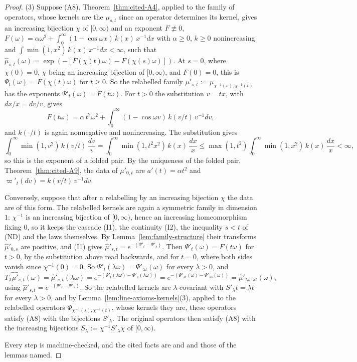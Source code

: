 \begin{proof}
(3) Suppose (A8). Theorem~\ref{thm:cited-A4}, applied to the family of operators, whose kernels
are the $\mu_{s,t}$ since an operator determines its kernel, gives an increasing bijection $\chi$
of $[0,\infty)$ and an exponent $F \not\equiv 0$,
$F(\omega) = \alpha\omega^2 + \int_0^\infty(1 - \cos\omega x)\,k(x)\,x^{-1}dx$ with $\alpha \ge 0$,
$k \ge 0$ nonincreasing and $\int\min(1,x^2)\,k(x)\,x^{-1}dx < \infty$, such that
$\widehat\mu_{s,t}(\omega) = \exp(-[F(\chi(t)\omega) - F(\chi(s)\omega)])$. At $s = 0$, where
$\chi(0) = 0$, $\chi$ being an increasing bijection of $[0,\infty)$, and $F(0) = 0$, this is
$\Psi_t(\omega) = F(\chi(t)\omega)$ for $t \ge 0$. So the relabelled family
$\mu'_{s,t} := \mu_{\chi^{-1}(s),\chi^{-1}(t)}$ has the exponents $\Psi'_t(\omega) = F(t\omega)$.
For $t > 0$ the substitution $v = tx$, with $dx/x = dv/v$, gives
\[
  F(t\omega) = \alpha\,t^2\omega^2 + \int_0^\infty(1 - \cos\omega v)\,k(v/t)\,v^{-1}dv ,
\]
and $k(\cdot/t)$ is again nonnegative and nonincreasing. The substitution gives
\[
  \int_0^\infty\min(1, v^2)\,k(v/t)\,\frac{dv}{v} = \int_0^\infty\min(1, t^2x^2)\,k(x)\,\frac{dx}{x}
  \le \max(1, t^2)\int_0^\infty\min(1, x^2)\,k(x)\,\frac{dx}{x} < \infty ,
\]
so this is the exponent of a folded pair. By the
uniqueness of the folded pair, Theorem~\ref{thm:cited-A9}, the data of $\mu'_{0,t}$ are $a'(t) = \alpha t^2$ and
$\varpi'_t(dv) = k(v/t)\,v^{-1}dv$.

Conversely, suppose that after a relabelling by an increasing bijection $\chi$ the data are of
this form. The relabelled kernels are again a symmetric family in dimension $1$: $\chi^{-1}$ is an
increasing bijection of $[0,\infty)$, hence an increasing homeomorphism fixing $0$, so it keeps the
cascade (I1), the continuity (I2), the inequality $s < t$ of (ND) and the laws themselves. By
Lemma~\ref{lem:family-structure} their transforms $\widehat\mu'_{0,s}$ are positive, and (I1) gives
$\widehat\mu'_{s,t} = e^{-(\Psi'_t - \Psi'_s)}$. Then $\Psi'_t(\omega) = F(t\omega)$ for $t > 0$,
by the substitution above read
backwards, and for $t = 0$, where both sides vanish since $\chi^{-1}(0) = 0$. So
$\Psi'_t(\lambda\omega) = \Psi'_{\lambda t}(\omega)$ for every $\lambda > 0$, and
\[
  \widehat{T_\lambda\mu'_{s,t}}(\omega) = \widehat\mu'_{s,t}(\lambda\omega)
  = e^{-(\Psi'_t(\lambda\omega) - \Psi'_s(\lambda\omega))}
  = e^{-(\Psi'_{\lambda t}(\omega) - \Psi'_{\lambda s}(\omega))}
  = \widehat\mu'_{\lambda s,\lambda t}(\omega) ,
\]
using $\widehat\mu'_{s,t} = e^{-(\Psi'_t - \Psi'_s)}$. So the relabelled kernels are
$\lambda$-covariant with $S'_\lambda t = \lambda t$ for every $\lambda > 0$, and by
Lemma~\ref{lem:line-axioms-kernels}(3), applied to the relabelled operators
$\Phi_{\chi^{-1}(s),\chi^{-1}(t)}$, whose kernels they are, these operators satisfy (A8) with the
bijections $S'_\lambda$. The original operators then satisfy (A8) with the increasing bijections
$S_\lambda := \chi^{-1}S'_\lambda\chi$ of $[0,\infty)$.

Every step is machine-checked, and the cited facts are  and  and those of
the lemmas named.
\end{proof}

